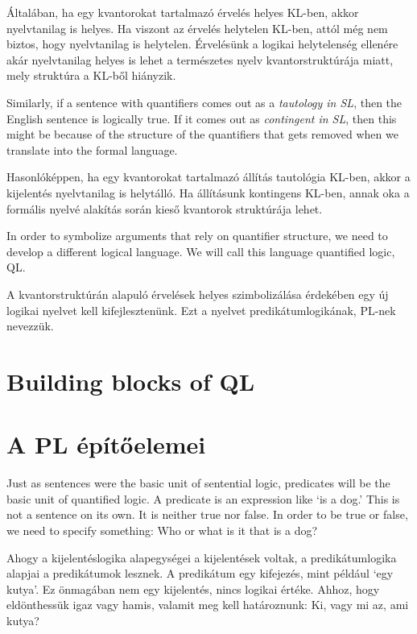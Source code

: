 Általában, ha egy kvantorokat tartalmazó érvelés helyes KL-ben, akkor nyelvtanilag is helyes. Ha viszont az érvelés helytelen KL-ben, attól még nem biztos, hogy nyelvtanilag is helytelen. Érvelésünk a logikai helytelenség ellenére akár nyelvtanilag helyes is lehet a természetes nyelv kvantorstruktúrája miatt, mely struktúra a KL-ből hiányzik.


Similarly, if a sentence with quantifiers comes out as a \emph{tautology in SL}, then the English sentence is logically true. If it comes out as \emph{contingent in SL}, then this might be because of the structure of the quantifiers that gets removed when we translate into the formal language.

Hasonlóképpen, ha egy kvantorokat tartalmazó állítás tautológia KL-ben, akkor a kijelentés nyelvtanilag is helytálló. Ha állításunk kontingens KL-ben, annak oka a formális nyelvé alakítás során kieső kvantorok struktúrája lehet.

In order to symbolize arguments that rely on quantifier structure, we need to develop a different logical language. We will call this language quantified logic, QL.

A kvantorstruktúrán alapuló érvelések helyes szimbolizálása érdekében egy új logikai nyelvet kell kifejlesztenünk. Ezt a nyelvet predikátumlogikának, PL-nek nevezzük.

\section*{Building blocks of QL}
\section{A PL építőelemei}

Just as sentences were the basic unit of sentential logic, predicates will be the basic unit of quantified logic. A predicate is an expression like `is a dog.' This is not a sentence on its own. It is neither true nor false. In order to be true or false, we need to specify something: Who or what is it that is a dog?

Ahogy a kijelentéslogika alapegységei a kijelentések voltak, a predikátumlogika alapjai a predikátumok lesznek. A predikátum egy kifejezés, mint például `egy kutya'. Ez önmagában nem egy kijelentés, nincs logikai értéke. Ahhoz, hogy eldönthessük igaz vagy hamis, valamit meg kell határoznunk: Ki, vagy mi az, ami kutya?

